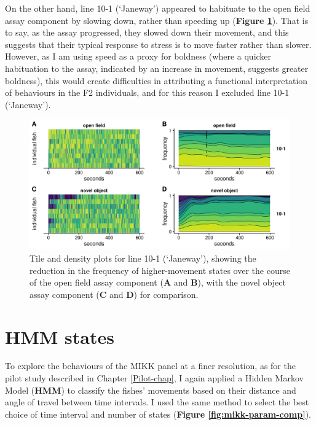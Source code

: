 \documentclass[
]{book}
\begin{document}
On the other hand, line \textcolor{10-1 (‘Janeway’)_F8766D}{10-1 (‘Janeway’)} appeared to habituate to the open field assay component by slowing down, rather than speeding up (\textbf{Figure \ref{fig:10-1-dens}}). That is to say, as the assay progressed, they slowed down their movement, and this suggests that their typical response to stress is to move faster rather than slower. However, as I am using speed as a proxy for boldness (where a quicker habituation to the assay, indicated by an increase in movement, suggests greater boldness), this would create difficulties in attributing a functional interpretation of behaviours in the F2 individuals, and for this reason I excluded line \textcolor{10-1 (‘Janeway’)_F8766D}{10-1 (‘Janeway’)}.



\begin{figure}
\includegraphics[width=1\linewidth]{figs/mikk_behaviour/select_0.08_15_10-1_dge} \caption{Tile and density plots for line \textcolor{10-1 (‘Janeway’)_F8766D}{10-1 (‘Janeway’)}, showing the reduction in the frequency of higher-movement states over the course of the open field assay component (\textbf{A} and \textbf{B}), with the novel object assay component (\textbf{C} and \textbf{D}) for comparison.}\label{fig:10-1-dens}
\end{figure}

\clearpage

\hypertarget{hmm-states}{%
\section{HMM states}\label{hmm-states}}

To explore the behaviours of the MIKK panel at a finer resolution, as for the pilot study described in Chapter \ref{Pilot-chap}, I again applied a Hidden Markov Model (\textbf{HMM}) to classify the fishes' movements based on their distance and angle of travel between time intervals. I used the same method to select the best choice of time interval and number of states (\textbf{Figure \ref{fig:mikk-param-comp}}).
\end{document}
